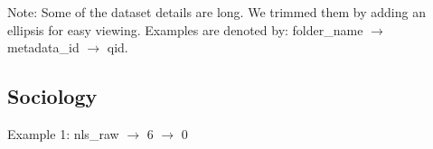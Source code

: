 
Note: Some of the dataset details are long. We trimmed them by adding an ellipsis for easy viewing. Examples are denoted by: folder\_name $\rightarrow$ metadata\_id $\rightarrow$ qid.

\subsection{Sociology}

Example 1: nls\_raw $\rightarrow$ 6 $\rightarrow$ 0

